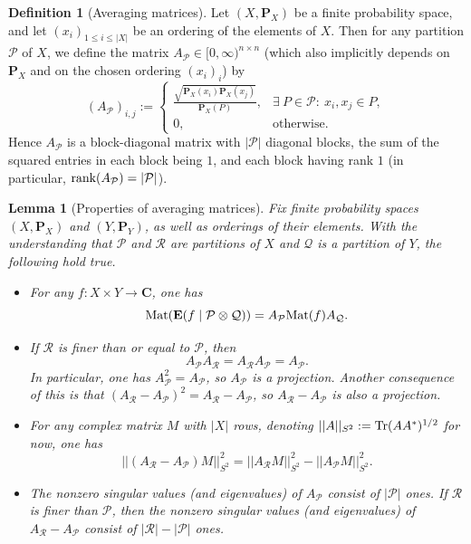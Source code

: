 \documentclass[reqno,11pt]{amsart}
\newtheorem{lemma}[theorem]{Lemma}
\theoremstyle{definition}
\newtheorem{definition}[theorem]{Definition}
\theoremstyle{remark}
\numberwithin{equation}{section}
\newcommand{\C}{\mathbf{C}}
\renewcommand{\P}{\mathbf{P}}
\newcommand{\E}{\mathbf{E}}
\newcommand{\mR}{\mathcal{R}}
\newcommand{\mP}{\mathcal{P}}
\newcommand{\mQ}{\mathcal{Q}}
\newcommand{\Tr}{\textnormal{Tr}}
\newcommand{\Mat}{\textnormal{Mat}}
\newcommand{\rank}{\textnormal{rank}}
\begin{document}
\begin{definition}[Averaging matrices]
Let $(X, \P_X)$ be a finite probability space, and let $(x_i)_{1 \le i \le |X|}$ be an ordering of the elements of $X$. Then for any partition $\mP$ of $X$, we define the matrix $A_{\mP} \in [0, \infty)^{n \times n}$ (which also implicitly depends on $\P_X$ and on the chosen ordering $(x_i)_i$) by
\[
    (A_{\mP})_{i,j} := \begin{cases}
    \frac{\sqrt{\P_X(x_i)\P_X(x_j)}}{\P_X(P)}, & \exists\ P \in \mP :\ x_i, x_j \in P, \\
    0, &\text{otherwise}.
    \end{cases}
\]
Hence $A_\mP$ is a block-diagonal matrix with $|\mP|$ diagonal blocks, the sum of the squared entries in each block being $1$, and each block having rank $1$ (in particular, $\rank (A_\mP) = |\mP|$).
\end{definition}

\begin{lemma}[Properties of averaging matrices] \label{lem:averaging-matrices}
Fix finite probability spaces $(X, \P_X)$ and $(Y, \P_Y)$, as well as orderings of their elements. With the understanding that $\mP$ and $\mR$ are partitions of $X$ and $\mQ$ is a partition of $Y$, the following hold true.
\begin{itemize}
    \item[$(i)$.] For any $f : X \times Y \to \C$, one has
    \[
        \Mat(\E(f \mid \mP \otimes \mQ)) = A_{\mP} \Mat(f) A_{\mQ}.
    \]
    \item[$(ii)$.] If $\mR$ is finer than or equal to $\mP$, then
    \[
        A_\mP A_{\mR} = A_{\mR} A_\mP = A_\mP.
    \]
    In particular, one has $A_\mP^2 = A_\mP$, so $A_\mP$ is a projection. Another consequence of this is that $(A_{\mR} - A_\mP)^2 = A_{\mR} - A_\mP$, so $A_{\mR} - A_\mP$ is also a projection.
    \item[$(iii)$.] For any complex matrix $M$ with $|X|$ rows, denoting $||A||_{S^2} := \Tr(A A^*)^{1/2}$ for now, one has
    \begin{equation} \label{eq:energy-increment-matrices}
        ||(A_{\mR} - A_\mP)M||_{S^2}^2 = ||A_{\mR} M||_{S^2}^2 - ||A_\mP M||_{S^2}^2.
    \end{equation}
    \item[$(iv)$.] The nonzero singular values (and eigenvalues) of $A_\mP$ consist of $|\mP|$ ones. If $\mR$ is finer than $\mP$, then the nonzero singular values (and eigenvalues) of $A_\mR - A_\mP$ consist of $|\mR| - |\mP|$ ones.
\end{itemize}
\end{lemma}
\end{document}
